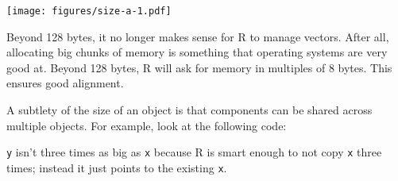 \begin{Shaded}
\begin{Highlighting}[]
\NormalTok{(}\NormalTok{:}\StringTok{ }\NormalTok{, } \NormalTok{, }
   \NormalTok{, } \NormalTok{)}
\NormalTok{(} \NormalTok{, } \NormalTok{)}
\NormalTok{(} \NormalTok{(}\NormalTok{, }\NormalTok{, }\NormalTok{, }\NormalTok{, }\NormalTok{, }\NormalTok{), } \NormalTok{)}
\NormalTok{(} \NormalTok{, } \NormalTok{, } \NormalTok{, } \NormalTok{)}
\StringTok{ }\NormalTok{, } \NormalTok{)}
\end{Highlighting}
\end{Shaded}

\texttt{[image: figures/size-a-1.pdf]}

Beyond 128 bytes, it no longer makes sense for R to manage vectors.
After all, allocating big chunks of memory is something that operating
systems are very good at. Beyond 128 bytes, R will ask for memory in
multiples of 8 bytes. This ensures good alignment.

A subtlety of the size of an object is that components can be shared
across multiple objects. For example, look at the following code:

\begin{Shaded}
\begin{Highlighting}[]
\StringTok{ }\NormalTok{:}

\StringTok{ }
\end{Highlighting}
\end{Shaded}

\texttt{y} isn't three times as big as \texttt{x} because R is smart
enough to not copy \texttt{x} three times; instead it just points to the
existing \texttt{x}.

